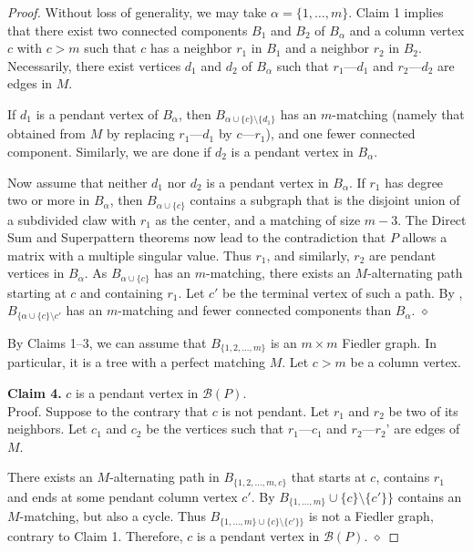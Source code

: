 \documentclass[preprint,12pt]{elsarticle}
\begin{document}
\begin{proof}
Without loss of generality, we may take $\alpha=\{1,\ldots, m\}$.
Claim 1 implies that there exist two connected components $B_1$ and $B_2$ of $B_{\alpha}$
and a column vertex $c$ with $c>m$ such that $c$ has a neighbor $r_1$ in $B_1$
and a neighbor $r_2$ in $B_2$.
Necessarily, there exist vertices $d_1$ and $d_2$ of $B_{\alpha}$
such that {$r_1$---$d_1$} and {$r_2$---$d_2$} are edges in $M$.




If $d_1$ is a pendant vertex of $B_{\alpha}$, then $B_{\alpha \cup \{ c\} \setminus \{ d_1\}}$ has an  $m$-matching
(namely that obtained from $M$ by replacing $r_1$---$d_1$ by $c$---$r_1$), 
and one fewer connected component.
Similarly, we are done if $d_2$ is a pendant vertex in $B_{\alpha}$. 

Now assume that neither $d_1$ nor $d_2$ is a pendant vertex in $B_{\alpha}$. If $r_1$ has degree two or more in $B_\alpha$, 
then $B_{\alpha\cup \{c\}}$ contains a subgraph that is the 
disjoint union of  a subdivided claw with $r_1$ as the center, and a matching 
of size $m-3$. The Direct Sum and Superpattern theorems now 
lead to the contradiction that $P$ allows a matrix with a multiple singular value.  Thus $r_1$, and similarly, $r_2$ are pendant vertices
in $B_{\alpha}$.  As $B_{\alpha \cup \{c\} }$ has an $m$-matching, 
there exists an $M$-alternating path starting at $c$ and containing 
$r_1$. Let $c'$ be the terminal vertex of such a 
path. By , $B_{\{\alpha \cup \{ c\} \setminus{c'} }$
has an $m$-matching and fewer connected components than $B_{\alpha}$.
\hfill $\diamond$ 



\bigskip 
By Claims 1--3, we can assume that $B_{\{ 1,2,\ldots, m\}}$
is an $m\times m$ Fiedler graph. In particular, it is a tree
with a perfect matching $M$. Let $c>m$ be a column vertex. 

\bigskip\noindent 
{\bf Claim 4. } $c$ is a pendant vertex in $\mathcal{B}(P)$.
\\[12pt]
Proof. Suppose to the contrary that $c$ is not pendant. 
Let $r_1$ and $r_2$ be two of its neighbors.
Let $c_1$ and $c_2$ be the vertices such that $r_1$---$c_1$ and $r_2$---$r_2$' are edges of $M$. 

There exists an $M$-alternating path 
in $B_{\{1,2,\ldots, m,c\}}$ that starts at $c$, contains $r_1$ 
and ends at some pendant column vertex $c'$.  By 
$B_{\{1, \ldots, m\}} \cup \{c\} \setminus \{c'\}\}$ contains 
an $M$-matching, but also a cycle. Thus  $B_{\{1, \ldots, m\} \cup \{c\} \setminus \{c'\}\}}$ is not a Fiedler graph, contrary to Claim 1.
Therefore, $c$ is  a pendant vertex in $\mathcal{B}(P)$. \hfill $\diamond$ 



\end{proof}
\end{document}
